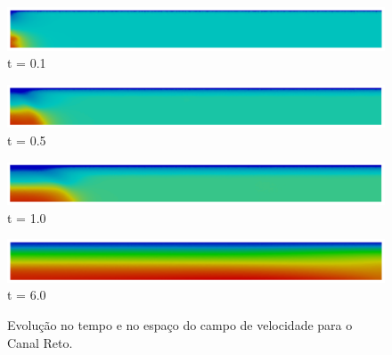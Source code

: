 \begin{figure}[H]
     \begin{minipage}{.50\linewidth}
      \centering
      \includegraphics[scale=0.17]{cap_solution/figure/vel_Straight20.png}\\
      t = 0.1
     \end{minipage}%
     \begin{minipage}{.50\linewidth}
      \centering
      \includegraphics[scale=0.17]{cap_solution/figure/vel_Straight100.png}\\
      t = 0.5
     \end{minipage}
     \begin{minipage}{.50\linewidth}
     \medskip
      \centering
      \includegraphics[scale=0.17]{cap_solution/figure/vel_Straight200.png}\\
      t = 1.0
     \end{minipage}%
     \begin{minipage}{.50\linewidth}
     \medskip
      \centering
      \includegraphics[scale=0.17]{cap_solution/figure/vel_Straight1200.png}\\
      t = 6.0
     \end{minipage}
     \medskip
     \caption{Evolução no tempo e no espaço do campo de velocidade para o Canal Reto.}
     \label{velocity field straight}
\end{figure}

